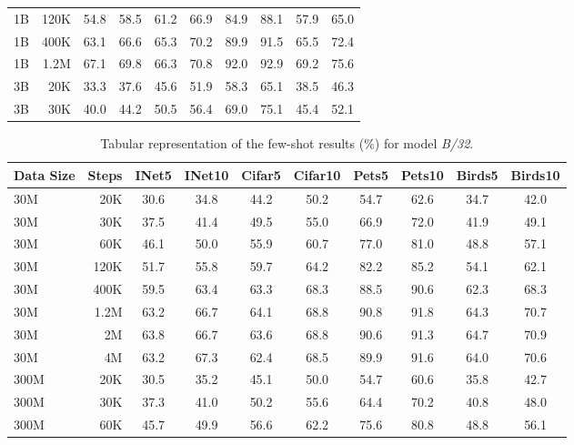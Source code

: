 \begin{table}[t]
\begin{tabulary}{1.0\textwidth}{l r c c c c c c c c}
1B    & 120K  & 54.8 & 58.5 & 61.2 & 66.9 & 84.9 & 88.1 & 57.9 & 65.0 \\
1B    & 400K  & 63.1 & 66.6 & 65.3 & 70.2 & 89.9 & 91.5 & 65.5 & 72.4 \\
1B    & 1.2M  & 67.1 & 69.8 & 66.3 & 70.8 & 92.0 & 92.9 & 69.2 & 75.6 \\
\midrule[0.25pt]
3B    & 20K   & 33.3 & 37.6 & 45.6 & 51.9 & 58.3 & 65.1 & 38.5 & 46.3 \\
3B    & 30K   & 40.0 & 44.2 & 50.5 & 56.4 & 69.0 & 75.1 & 45.4 & 52.1 \\
    \bottomrule
  \end{tabulary}
\end{table}


\begin{table}[t]
  \setlength{\tabcolsep}{5pt}
  \setlength{\extrarowheight}{5pt}
  \renewcommand{\arraystretch}{0.75}
  \centering
  \caption{Tabular representation of the few-shot results (\%) for model \emph{B/32}.}\label{tbl:b_32}
  \begin{tabulary}{1.0\textwidth}{l r c c c c c c c c}
    \toprule[1pt]
    \bf{Data Size} & \bf{Steps} & \bf{INet5} & \bf{INet10} & \bf{Cifar5} & \bf{Cifar10} & \bf{Pets5} & \bf{Pets10} & \bf{Birds5} & \bf{Birds10} \\
    \midrule
30M   & 20K   & 30.6 & 34.8 & 44.2 & 50.2 & 54.7 & 62.6 & 34.7 & 42.0 \\
30M   & 30K   & 37.5 & 41.4 & 49.5 & 55.0 & 66.9 & 72.0 & 41.9 & 49.1 \\
30M   & 60K   & 46.1 & 50.0 & 55.9 & 60.7 & 77.0 & 81.0 & 48.8 & 57.1 \\
30M   & 120K  & 51.7 & 55.8 & 59.7 & 64.2 & 82.2 & 85.2 & 54.1 & 62.1 \\
30M   & 400K  & 59.5 & 63.4 & 63.3 & 68.3 & 88.5 & 90.6 & 62.3 & 68.3 \\
30M   & 1.2M    & 63.2 & 66.7 & 64.1 & 68.8 & 90.8 & 91.8 & 64.3 & 70.7 \\
30M   & 2M    & 63.8 & 66.7 & 63.6 & 68.8 & 90.6 & 91.3 & 64.7 & 70.9 \\
30M   & 4M    & 63.2 & 67.3 & 62.4 & 68.5 & 89.9 & 91.6 & 64.0 & 70.6 \\
\midrule[0.25pt]
300M  & 20K   & 30.5 & 35.2 & 45.1 & 50.0 & 54.7 & 60.6 & 35.8 & 42.7 \\
300M  & 30K   & 37.3 & 41.0 & 50.2 & 55.6 & 64.4 & 70.2 & 40.8 & 48.0 \\
300M  & 60K   & 45.7 & 49.9 & 56.6 & 62.2 & 75.6 & 80.8 & 48.8 & 56.1 \\

\end{tabulary}
\end{table}
